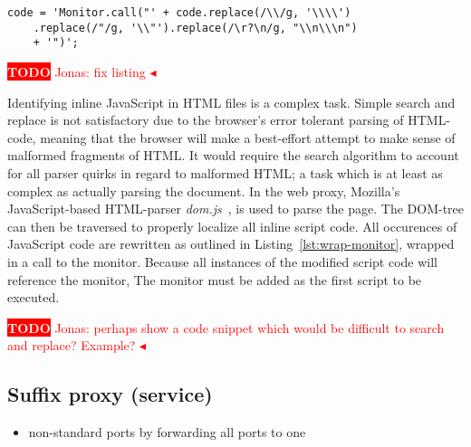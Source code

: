 \documentclass{llncs}
\newcommand{\todo}[1]{\colorbox{red}{\textcolor{white}{\sffamily\bfseries\scriptsize TODO}} \textcolor{red}{#1} \textcolor{red}{$\blacktriangleleft$}}
\begin{document}
\begin{lstlisting}[label=lst:wrap-monitor, caption=Example of monitor wrapping]
code = 'Monitor.call("' + code.replace(/\\/g, '\\\\')
	.replace(/"/g, '\\"').replace(/\r?\n/g, "\\n\\\n")
	+ '")';
\end{lstlisting}
\todo{Jonas: fix listing}


Identifying inline JavaScript in HTML files is a complex task. 
Simple search and replace is not satisfactory due to the browser's error tolerant parsing of HTML-code, meaning that the 
browser will make a best-effort attempt to make sense of malformed fragments of 
HTML. It would require the search 
algorithm to account for all parser quirks in regard to malformed HTML;
a task which is at least as complex as actually parsing the document.
In the web proxy, Mozilla's JavaScript-based HTML-parser \emph{dom.js}~\cite{Mozilla:dom.js}, is used 
to parse the page. The DOM-tree can then be traversed to properly localize 
all inline script code. All occurences of JavaScript code are rewritten as 
outlined in Listing~\ref{lst:wrap-monitor}, wrapped in a call to the monitor.
Because all instances of the modified script code will reference the monitor, 
The monitor must be added as the first script to be executed.

\todo{Jonas: perhaps show a code snippet which would be difficult to search and replace? Example?}

\subsection{Suffix proxy (service)}

\begin{itemize}
\item non-standard ports by forwarding all ports to one
\end{itemize}
\end{document}
